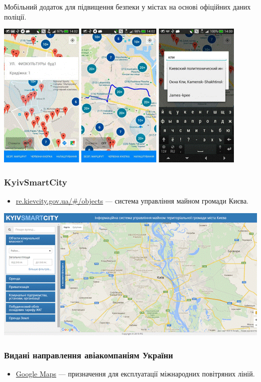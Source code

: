 Мобільний додаток для підвищення безпеки у містах на основі офіційних даних поліції.

\includegraphics{images/027.gif}

\subsubsection{KyivSmartCity}

\begin{itemize}
    \item \href{http://re.kievcity.gov.ua/#/objects}{re.kievcity.gov.ua/#/objects} — система управління майном громади Києва.
\end{itemize}

\includegraphics{images/028.gif}

\subsubsection{Видані направлення авіакомпаніям України}

\begin{itemize}
    \item \href{https://www.google.com/maps/d/viewer?mid=zQyzchol-IlQ.kqJvVjvXIY-s&hl=en_US}{Google Maps} — призначення для експлуатації міжнародних повітряних ліній.
\end{itemize}

